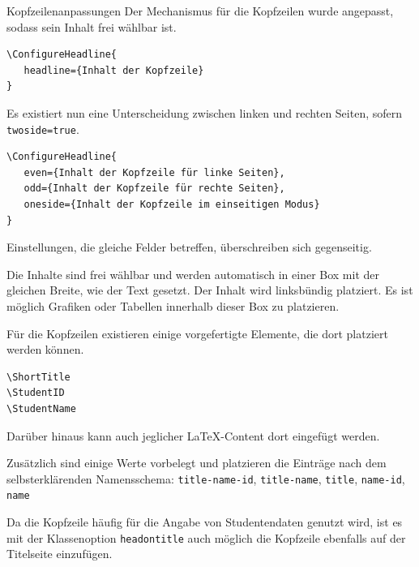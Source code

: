 \documentclass[
	ngerman,%
	accentcolor=9c,%
	points=true, für die Aktivierung der Punktereferenzen
]{tudaexercise}
\newcommand*{\code}[1]{\texttt{#1}}
\begin{document}
\begin{task}{Kopfzeilenanpassungen}
	Der Mechanismus für die Kopfzeilen wurde angepasst, sodass sein Inhalt frei wählbar ist.

\begin{verbatim}
\ConfigureHeadline{
   headline={Inhalt der Kopfzeile}
}
\end{verbatim}

	Es existiert nun eine Unterscheidung zwischen linken und rechten Seiten, sofern \code{twoside=true}.

\begin{verbatim}
\ConfigureHeadline{
   even={Inhalt der Kopfzeile für linke Seiten},
   odd={Inhalt der Kopfzeile für rechte Seiten},
   oneside={Inhalt der Kopfzeile im einseitigen Modus}
}
\end{verbatim}

	Einstellungen, die gleiche Felder betreffen, überschreiben sich gegenseitig.

	\begin{subtask}[title={Freie Inhalte}]
		Die Inhalte sind frei wählbar und werden automatisch in einer Box mit der gleichen Breite, wie der Text gesetzt. Der Inhalt wird linksbündig platziert. Es ist möglich Grafiken oder Tabellen innerhalb dieser Box zu platzieren.
	\end{subtask}

	\begin{subtask}[title={Vorgefertigte Elemente}]
		Für die Kopfzeilen existieren einige vorgefertigte Elemente, die dort platziert werden können.
\begin{verbatim}
\ShortTitle
\StudentID
\StudentName
\end{verbatim}
		Darüber hinaus kann auch jeglicher \LaTeX-Content dort eingefügt werden.

		Zusätzlich sind einige Werte vorbelegt und platzieren die Einträge nach dem selbsterklärenden Namensschema:
		\code{title-name-id}, \code{title-name}, \code{title}, \code{name-id}, \code{name}
	\end{subtask}

	\begin{subtask}[title={Kopfzeile auch auf der Titelseite}]
		Da die Kopfzeile häufig für die Angabe von Studentendaten genutzt wird, ist es mit der Klassenoption \code{headontitle} auch möglich die Kopfzeile ebenfalls auf der Titelseite einzufügen.
	\end{subtask}
\end{task}
\end{document}
